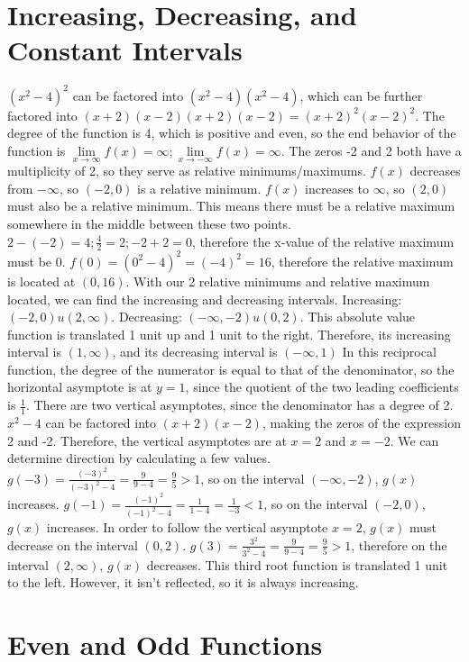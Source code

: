 \documentclass{report}
\begin{document}
\section{Increasing, Decreasing, and Constant Intervals}
\sol \((x^2-4)^2\) can be factored into \((x^2-4)(x^2-4)\), which can be further factored into \((x+2)(x-2)(x+2)(x-2)=(x+2)^2(x-2)^2\). The degree of the function is 4, which is positive and even, so the end behavior of the function is \(\underset{x\to\infty}{\lim}f(x)=\infty;\underset{x\to -\infty}{\lim}f(x)=\infty\). The zeros -2 and 2 both have a multiplicity of 2, so they serve as relative minimums/maximums. \(f(x)\) decreases from \(-\infty\), so \((-2,0)\) is a relative minimum. \(f(x)\) increases to \(\infty\), so \((2,0)\) must also be a relative minimum. This means there must be a relative maximum somewhere in the middle between these two points. \(2-(-2)=4;\frac{4}{2}=2;-2+2=0\), therefore the x-value of the relative maximum must be 0. \(f(0)=(0^2-4)^2=(-4)^2=16\), therefore the relative maximum is located at \((0, 16)\). With our 2 relative minimums and relative maximum located, we can find the increasing and decreasing intervals. Increasing: \((-2, 0)u(2,\infty)\). Decreasing: \((-\infty,-2)u(0,2)\).
\sol This absolute value function is translated 1 unit up and 1 unit to the right. Therefore, its increasing interval is \((1,\infty)\), and its decreasing interval is \((-\infty,1)\)
\sol In this reciprocal function, the degree of the numerator is equal to that of the denominator, so the horizontal asymptote is at \(y=1\), since the quotient of the two leading coefficients is \(\frac{1}{1}\). There are two vertical asymptotes, since the denominator has a degree of 2. \(x^2-4\) can be factored into \((x+2)(x-2)\), making the zeros of the expression 2 and -2. Therefore, the vertical asymptotes are at \(x=2\) and \(x=-2\). We can determine direction by calculating a few values. \(g(-3)=\frac{(-3)^2}{(-3)^2-4}=\frac{9}{9-4}=\frac{9}{5}>1\), so on the interval \((-\infty,-2)\), \(g(x)\) increases. \(g(-1)=\frac{(-1)^2}{(-1)^2-4}=\frac{1}{1-4}=\frac{1}{-3}<1\), so on the interval \((-2,0)\), \(g(x)\) increases. In order to follow the vertical asymptote \(x=2\), \(g(x)\) must decrease on the interval \((0,2)\). \(g(3)=\frac{3^2}{3^2-4}=\frac{9}{9-4}=\frac{9}{5}>1\), therefore on the interval \((2,\infty)\), \(g(x)\) decreases.
\sol This third root function is translated 1 unit to the left. However, it isn't reflected, so it is always increasing.
\section{Even and Odd Functions}
\end{document}

